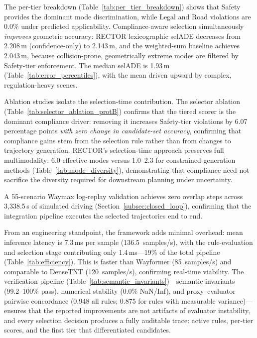 The per-tier breakdown (Table~\ref{tab:per_tier_breakdown}) shows that Safety provides the dominant mode discrimination, while Legal and Road violations are 0.0\% under predicted applicability.  Compliance-aware selection simultaneously \emph{improves} geometric accuracy: RECTOR lexicographic selADE decreases from 2.208\,m (confidence-only) to 2.143\,m, and the weighted-sum baseline achieves 2.043\,m, because collision-prone, geometrically extreme modes are filtered by Safety-tier enforcement.  The median selADE is 1.93\,m (Table~\ref{tab:error_percentiles}), with the mean driven upward by complex, regulation-heavy scenes.

Ablation studies isolate the selection-time contribution.  The selector ablation (Table~\ref{tab:selector_ablation_protB}) confirms that the tiered scorer is the dominant compliance driver: removing it increases Safety-tier violations by 6.07 percentage points \emph{with zero change in candidate-set accuracy}, confirming that compliance gains stem from the selection rule rather than from changes to trajectory generation.  RECTOR's selection-time approach preserves full multimodality: 6.0 effective modes versus 1.0--2.3 for constrained-generation methods (Table~\ref{tab:mode_diversity}), demonstrating that compliance need not sacrifice the diversity required for downstream planning under uncertainty.

A 55-scenario Waymax log-replay validation achieves zero overlap steps across 3{,}338.5\,s of simulated driving (Section~\ref{subsec:closed_loop}), confirming that the integration pipeline executes the selected trajectories end to end.

From an engineering standpoint, the framework adds minimal overhead: mean inference latency is 7.3\,ms per sample (136.5~samples/s), with the rule-evaluation and selection stage contributing only 1.4\,ms---19\% of the total pipeline (Table~\ref{tab:efficiency}).  This is faster than Wayformer (85~samples/s) and comparable to DenseTNT (120~samples/s), confirming real-time viability.  The verification pipeline (Table~\ref{tab:semantic_invariants})---semantic invariants (99.2--100\% pass), numerical stability (0.0\% NaN/Inf), and proxy--evaluator pairwise concordance (0.948 all rules; 0.875 for rules with measurable variance)---ensures that the reported improvements are not artifacts of evaluator instability, and every selection decision produces a fully auditable trace: active rules, per-tier scores, and the first tier that differentiated candidates.

